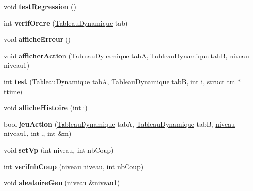 \begin{DoxyCompactItemize}
\item 
void {\bfseries test\+Regression} ()\hypertarget{classjeu_ac3ecbad278c391da5bd56bb6f2679a7b}{}\label{classjeu_ac3ecbad278c391da5bd56bb6f2679a7b}

\item 
int {\bfseries verif\+Ordre} (\hyperlink{classTableauDynamique}{Tableau\+Dynamique} tab)\hypertarget{classjeu_aead2ff12e229fcee534709d448e7aeb0}{}\label{classjeu_aead2ff12e229fcee534709d448e7aeb0}

\item 
void {\bfseries affiche\+Erreur} ()\hypertarget{classjeu_a6163fa8545180fbbdedaf58c2e1a48a9}{}\label{classjeu_a6163fa8545180fbbdedaf58c2e1a48a9}

\item 
void {\bfseries afficher\+Action} (\hyperlink{classTableauDynamique}{Tableau\+Dynamique} tabA, \hyperlink{classTableauDynamique}{Tableau\+Dynamique} tabB, \hyperlink{classniveau}{niveau} niveau1)\hypertarget{classjeu_ab43ad0bc0891355bf049ead4f67a1279}{}\label{classjeu_ab43ad0bc0891355bf049ead4f67a1279}

\item 
int {\bfseries test} (\hyperlink{classTableauDynamique}{Tableau\+Dynamique} tabA, \hyperlink{classTableauDynamique}{Tableau\+Dynamique} tabB, int i, struct tm $\ast$ttime)\hypertarget{classjeu_a073ab61bef315ebe3c985fc2840041c6}{}\label{classjeu_a073ab61bef315ebe3c985fc2840041c6}

\item 
void {\bfseries affiche\+Histoire} (int i)\hypertarget{classjeu_a062e5e543f9f1571fe76e5e9e340e2db}{}\label{classjeu_a062e5e543f9f1571fe76e5e9e340e2db}

\item 
bool {\bfseries jeu\+Action} (\hyperlink{classTableauDynamique}{Tableau\+Dynamique} tabA, \hyperlink{classTableauDynamique}{Tableau\+Dynamique} tabB, \hyperlink{classniveau}{niveau} niveau1, int i, int \&m)\hypertarget{classjeu_a7f2fac64700bd81e936cf54d6e7ec725}{}\label{classjeu_a7f2fac64700bd81e936cf54d6e7ec725}

\item 
void {\bfseries set\+Vp} (int \hyperlink{classniveau}{niveau}, int nb\+Coup)\hypertarget{classjeu_a32cb5cc33a36ddb52960794033d6e2d0}{}\label{classjeu_a32cb5cc33a36ddb52960794033d6e2d0}

\item 
int {\bfseries verifnb\+Coup} (\hyperlink{classniveau}{niveau} \hyperlink{classniveau}{niveau}, int nb\+Coup)\hypertarget{classjeu_a27ea852c9f3031007c68d780c5161b67}{}\label{classjeu_a27ea852c9f3031007c68d780c5161b67}

\item 
void {\bfseries aleatoire\+Gen} (\hyperlink{classniveau}{niveau} \&niveau1)\hypertarget{classjeu_acd9243df01b716fadbdefa37368edce3}{}\label{classjeu_acd9243df01b716fadbdefa37368edce3}

\end{DoxyCompactItemize}


